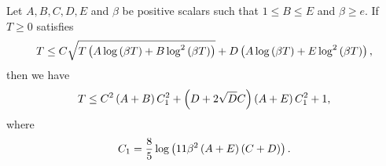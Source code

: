 \begin{lemma} \label{lemma:technical_tool_fast_active}
	Let $A, B, C, D, E$ and $\beta$ be positive scalars such that $1 \leq B \leq E$ and $\beta \geq e$. If $T \geq 0$ satisfies
	\begin{align*}
		T \leq C \sqrt{T \left(  A \log\left( \beta T \right) + B \log^2 \left( \beta T \right)  \right) } + D \left( A \log\left( \beta T \right) + E \log^2 \left( \beta T \right)  \right) ,
	\end{align*}
	then we have
	\begin{align*}
		T \leq C^2 \left( A+B \right) C_1^2 + \left( D+2\sqrt{D}C \right) \left( A+E \right) C_1^2 +1 ,
	\end{align*}
	where
	\begin{align*}
		C_1=\frac{8}{5}\log \left( 11 \beta^2 \left( A+E \right) \left( C+D \right) \right) .
	\end{align*}
\end{lemma}





